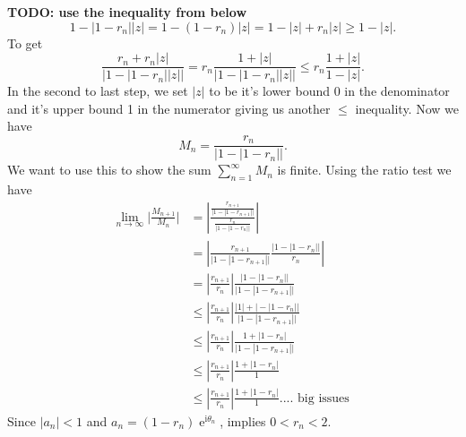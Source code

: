 \documentclass[10pt]{amsart}
\newcommand{\I}{\mathrm{i}}
\DeclareMathOperator{\E}{e}
\theoremstyle{nonumberplain}
\begin{document}
\begin{enumerate}[label={\bf {\arabic*}:}]
\begin{itemize}
\textbf{TODO: use the inequality from below $$ 1 - |1 -  r_n| |z| = 1 - (1 - r_n) |z| = 1 - |z| + r_n|z| \geq 1 - |z|.$$}
To get
$$
\frac{ r_n + r_n |z|}{ \big| 1 - |1 - r_n| |z| \big|}
	= r_n\frac{ 1 + |z|}{ \big| 1 - |1 - r_n| |z| \big|} 
	\leq r_n\frac{ 1 + |z|}{ 1 - |z|}.
$$
In the second to last step,  we set $|z|$ to be it's lower bound 0 in the denominator and it's upper bound 1 in the numerator giving us another $\leq$ inequality.
Now we have
$$ M_n = \frac{ r_n}{ \big| 1 - |1 - r_n|\big|}. $$
We want to use this to show the sum $ \sum_{n = 1}^\infty M_n $ is finite.
Using the ratio test we have
\begin{align*}
\lim_{n\rightarrow\infty} \Bigg| \frac {M_{n + 1}}{M_n} \Bigg|
	&= \left| \frac {\frac{ r_{n + 1}}{ \big| 1 - |1 - r_{n + 1}|\big|}}{\frac{ r_n}{ \big| 1 - |1 - r_n|\big|}} \right| \\
	&= \left|  \frac{ r_{n + 1}}{ \big| 1 - |1 - r_{n + 1}|\big|} \frac{ \big| 1 - |1 - r_n|\big|} { r_n}\right| \\
	&= \left|  \frac{ r_{n + 1}}{ r_n} \right| \frac{ \big| 1 - |1 - r_n|\big|}{ \big| 1 - |1 - r_{n + 1}|\big|} \\
	&\leq \left|  \frac{ r_{n + 1}}{ r_n} \right| \frac{|1| + \big|- |1 - r_n|\big|}{ \big| 1 - |1 - r_{n + 1}|\big|} \\
	&\leq \left|  \frac{ r_{n + 1}}{ r_n} \right| \frac{1 + |1 - r_n|}{ \big| 1 - |1 - r_{n + 1}|\big|} \\
	&\leq \left|  \frac{ r_{n + 1}}{ r_n} \right| \frac{1 + |1 - r_n|}{1} \\
	&\leq \left|  \frac{ r_{n + 1}}{ r_n} \right| \frac{1 + |1 - r_n|}{1} ....\text{ big issues }
\end{align*}
Since $|a_n| < 1$ and $a_n = (1 - r_n)\E^{\I \theta_n}$, implies $0 < r_n < 2$.


\end{itemize}
\end{enumerate}
\end{document}

